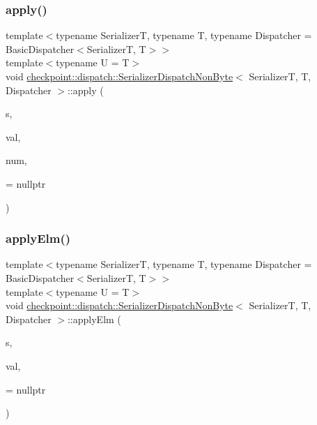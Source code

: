 \subsubsection{\texorpdfstring{apply()}{apply()}\hspace{0.1cm}{\footnotesize\ttfamily [2/2]}}
{\footnotesize\ttfamily template$<$typename SerializerT, typename T, typename Dispatcher = Basic\+Dispatcher$<$\+Serializer\+T, T$>$$>$ \\
template$<$typename U  = T$>$ \\
void \hyperlink{structcheckpoint_1_1dispatch_1_1_serializer_dispatch_non_byte}{checkpoint\+::dispatch\+::\+Serializer\+Dispatch\+Non\+Byte}$<$ SerializerT, T, Dispatcher $>$\+::apply (\begin{DoxyParamCaption}\item[{SerializerT \&}]{s,  }\item[{T $\ast$}]{val,  }\item[{\hyperlink{namespacecheckpoint_a083f6674da3f94c2901b18c6d238217c}{Serial\+Size\+Type}}]{num,  }\item[{has\+Not\+Virtual\+Serialize$<$ U $>$ $\ast$}]{ = {\ttfamily nullptr} }\end{DoxyParamCaption})\hspace{0.3cm}{\ttfamily [inline]}}

\mbox{\label{structcheckpoint_1_1dispatch_1_1_serializer_dispatch_non_byte_a3bbb12db16d00e1c76e51b52452187aa}} 
\subsubsection{\texorpdfstring{apply\+Elm()}{applyElm()}\hspace{0.1cm}{\footnotesize\ttfamily [1/3]}}
{\footnotesize\ttfamily template$<$typename SerializerT, typename T, typename Dispatcher = Basic\+Dispatcher$<$\+Serializer\+T, T$>$$>$ \\
template$<$typename U  = T$>$ \\
void \hyperlink{structcheckpoint_1_1dispatch_1_1_serializer_dispatch_non_byte}{checkpoint\+::dispatch\+::\+Serializer\+Dispatch\+Non\+Byte}$<$ SerializerT, T, Dispatcher $>$\+::apply\+Elm (\begin{DoxyParamCaption}\item[{SerializerT \&}]{s,  }\item[{T $\ast$}]{val,  }\item[{has\+Split\+Serialize$<$ U $>$ $\ast$}]{ = {\ttfamily nullptr} }\end{DoxyParamCaption})\hspace{0.3cm}{\ttfamily [inline]}}

